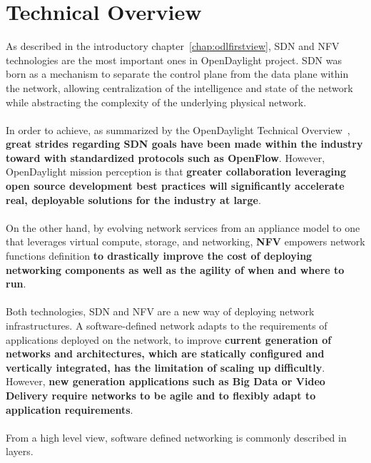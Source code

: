 \documentclass[a4paper, 12pt]{book}
\begin{document}
\section{Technical Overview}
\label{chap:odltech_overview}

As described in the introductory chapter~\ref{chap:odlfirstview}, SDN and NFV technologies are the most important ones in OpenDaylight project. SDN was born as a mechanism to separate the control plane from the data plane within the network, allowing centralization of the intelligence and state of the network while abstracting the complexity of the underlying physical network.\\
\\
In order to achieve, as summarized by the OpenDaylight Technical Overview~\cite{OpenDaylightTechOverview}, \textbf{great strides regarding SDN goals have been made within the industry toward with standardized protocols such as OpenFlow}. However, OpenDaylight mission perception is that \textbf{greater collaboration leveraging open source development best practices will significantly accelerate real, deployable solutions for the industry at large}.\\
\\
On the other hand, by evolving network services from an appliance model to one that leverages virtual compute, storage, and networking, \textbf{NFV} empowers network functions definition \textbf{to drastically improve the cost of deploying networking components as well as the agility of when and where to run}.\\
\\
Both technologies, SDN and NFV are a new way of deploying network infrastructures. A software-defined network adapts to the requirements of applications deployed on the network, to improve \textbf{current generation of networks and architectures, which are statically configured and vertically integrated, has the limitation of scaling up difficultly}. However, \textbf{new generation applications such as Big Data or Video Delivery require networks to be agile and to flexibly adapt to application requirements}.\\
\\
From a high level view, software defined networking is commonly described in layers.
\end{document}
